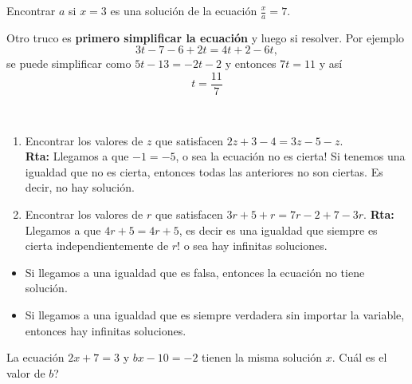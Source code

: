 \begin{exer}
Encontrar $a$ si $x=3$ es una solución de la ecuación $\frac{x}{a}=7$.
\end{exer}

\begin{tcolorbox}[colback=red!5!white,colframe=red!75!black]
	Otro truco es \textbf{primero simplificar la ecuación} y luego si resolver. Por ejemplo
	\[3t-7-6+2t=4t+2-6t,\]
	se puede simplificar como $5t-13=-2t-2$ y entonces $7t=11$ y así
	\[t=\frac{11}{7}\]
\end{tcolorbox}

\begin{ejemplo}{\ \\}
\begin{enumerate}
\item Encontrar los valores de $z$ que satisfacen $2z+3-4=3z-5-z$.\\
		\textbf{Rta: }Llegamos a que $-1=-5$, o sea la ecuación no es cierta! Si tenemos una igualdad que no es cierta, entonces todas las anteriores no son ciertas. Es decir, no hay solución.
\item Encontrar los valores de $r$ que satisfacen $3r+5+r=7r-2+7-3r$.
		\textbf{Rta: }Llegamos a que $4r+5=4r+5$, es decir es una igualdad que siempre es cierta independientemente de $r$! o sea hay infinitas soluciones.
\end{enumerate}
\end{ejemplo}

\begin{tcolorbox}[colback=red!5!white,colframe=red!75!black]
	\begin{itemize}
	\item 	Si llegamos a una igualdad que es falsa, entonces la ecuación no tiene solución.
	\item Si llegamos a una igualdad que es siempre verdadera sin importar la variable, entonces hay infinitas soluciones.
	\end{itemize}
\end{tcolorbox}


\begin{ejemplo}
La ecuación $2x+7=3$ y $bx-10=-2$ tienen la misma solución $x$. Cuál es el valor de $b$?
\end{ejemplo}

